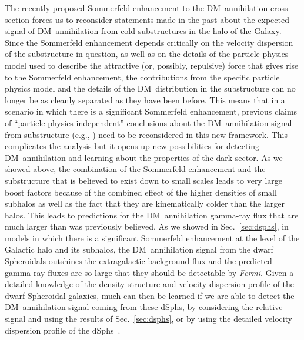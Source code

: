 \documentclass[aps,prd,twocolumn,amsmath,amssymb,floatfix,nofootinbib,10pt]{revtex4}
\newcommand{\eg}{e.g.}
\newcommand{\Fermi}{\emph{Fermi}}
\newcommand{\DM}{DM}
\newcommand{\dSphs}{dSphs}
\begin{document}
The recently proposed Sommerfeld enhancement to the \DM\ annihilation
cross section forces us to reconsider statements made in the past
about the expected signal of \DM\ annihilation from cold substructures
in the halo of the Galaxy. Since the Sommerfeld enhancement depends
critically on the velocity dispersion of the substructure in
question, as well as on the details of the particle physics model used
to describe the attractive (or, possibly, repulsive) force that gives
rise to the Sommerfeld enhancement, the contributions from the
specific particle physics model and the details of the \DM\
distribution in the substructure can no longer be as cleanly separated
as they have been before. This means that in a scenario in which there
is a significant Sommerfeld enhancement, previous claims of ``particle
physics independent'' conclusions about the \DM\ annihilation signal
from substructure (\eg,
\cite{2007PhRvD..75h3526S,2008Natur.456...73S}) need to be
reconsidered in this new framework. This complicates the analysis but
it opens up new possibilities for detecting \DM\ annihilation and
learning about the properties of the dark sector. As we showed above,
the combination of the Sommerfeld enhancement and the substructure
that is believed to exist down to small scales leads to very large
boost factors because of the combined effect of the higher densities
of small subhalos as well as the fact that they are kinematically
colder than the larger halos. This leads to predictions for the \DM\
annihilation gamma-ray flux that are much larger than was previously
believed. As we showed in Sec.~\ref{sec:dsphs}, in models in which
there is a significant Sommerfeld enhancement at the level of the
Galactic halo and its subhalos, the \DM\ annihilation signal from the
dwarf Spheroidals outshines the extragalactic background flux and the
predicted gamma-ray fluxes are so large that they should be detectable
by \Fermi. Given a detailed knowledge of the density structure and
velocity dispersion profile of the dwarf Spheroidal galaxies, much can
then be learned if we are able to detect the \DM\ annihilation signal
coming from these \dSphs, by considering the relative signal and using
the results of Sec.~\ref{sec:dsphs}, or by using the detailed velocity
dispersion profile of the \dSphs\ \cite{2009arXiv0902.0362R}.
\end{document}
